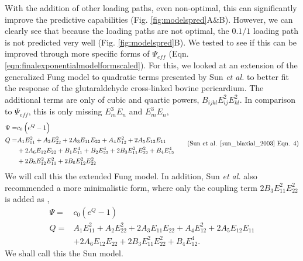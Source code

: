     With the addition of other loading paths, even non-optimal, this can significantly improve the predictive capabilities (Fig. \ref{fig:modelspred}A\&B). However, we can clearly see that because the loading paths are not optimal, the $0.1/1$ loading path is not predicted very well (Fig. \ref{fig:modelspred}B). We tested to see if this can be improved through more specific forms of $\Psi_{eff}$ (Eqn. \ref{eqn:finalexponentialmodelformscaled}). For this, we looked at an extension of the generalized Fung model to quadratic terms presented by Sun \textit{et al.} \cite{sun_biaxial_2003} to better fit the response of the glutaraldehyde cross-linked bovine pericardium. The additional terms are only of cubic and quartic powers, $B_{ijkl}E_{ij}^2E_{kl}^2$. In comparison to $\Psi_{eff}$, this is only missing $E_m^3E_n$ and $E_m^3E_n$,
\begin{equation}\label{eqn:fullsunmodel}
\begin{aligned}
\Psi	=& c_0 \left(e^{Q} - 1\right) \\
Q		=& A_1 E_{11}^2 + A_2 E_{22}^2 + 2A_3E_{11}E_{22} + A_4 E_{12}^2 + 2A_5E_{12}E_{11}	\\
	&+ 2A_6E_{12}E_{22} + B_1 E_{11}^4 + B_2 E_{22}^4 + 2B_3E_{11}^2E_{22}^2 + B_4 E_{12}^4	\\
    &+ 2B_5E_{12}^2E_{11}^2 + 2B_6E_{12}^2E_{22}^2 
\end{aligned}\tag{Sun et al. \cite{sun_biaxial_2003} Eqn. 4}
\end{equation}
We will call this the extended Fung model. In addition, Sun \textit{et al.} \cite{sun_biaxial_2003} also recommended a more minimalistic form, where only the coupling term $2B_3E_{11}^2E_{22}^2$ is added as , 
\begin{equation}\label{eqn:extendedfung}
\begin{aligned}
\Psi	=& c_0 \left(e^{Q} - 1\right) \\
Q		=& A_1 E_{11}^2 + A_2 E_{22}^2 + 2A_3E_{11}E_{22} + A_4 E_{12}^2 + 2A_5E_{12}E_{11}	\\
	&+ 2A_6E_{12}E_{22} + 2B_3E_{11}^2E_{22}^2 + B_4 E_{12}^4.
\end{aligned}
\end{equation}
    We shall call this the Sun model. 

